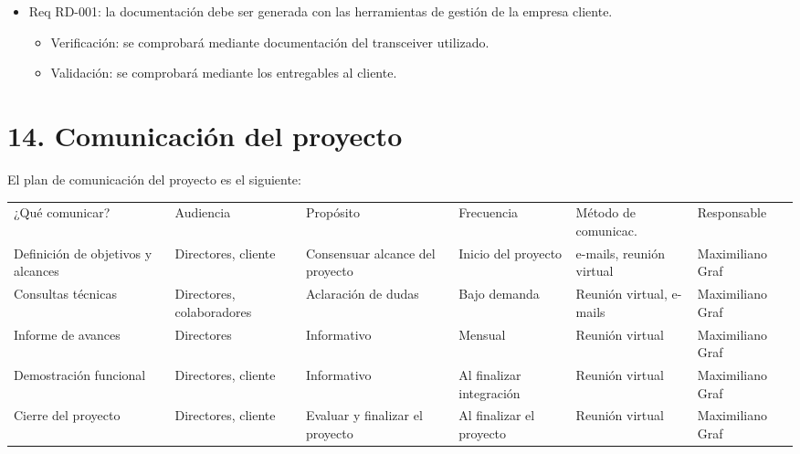 \documentclass[11pt]{charter}
\begin{document}
\begin{itemize} 
\item Req RD-001: la documentación debe ser generada con las herramientas de gestión de la empresa cliente.
\begin{itemize}
\item Verificación: se comprobará mediante documentación del transceiver utilizado. 
\item Validación: se comprobará mediante los entregables al cliente.
\end{itemize}
\end{itemize}



\section{14. Comunicación del proyecto}
\label{sec:comunicaciones}

El plan de comunicación del proyecto es el siguiente:

\begin{table}[htpb]
\centering
\begin{tabularx}{\linewidth}{@{}|C{2.3cm}|C{2.3cm}|C{2.5cm}|C{1.8cm}|C{2.3cm}|C{2.1cm}|@{}}
\hline
{} 
           \\ \hline
{} 
¿Qué comunicar? & Audiencia & Propósito & Frecuencia & Método de comunicac. & Responsable \\ \hline
Definición de objetivos y alcances                &  Directores, cliente         &    Consensuar alcance del proyecto       &     Inicio del proyecto   & e-mails, reunión virtual    & Maximiliano Graf			  \\ \hline
Consultas técnicas   &   Directores, colaboradores    &     Aclaración de dudas      &     Bajo demanda     &     Reunión virtual, e-mails                 & Maximiliano Graf            \\ \hline
Informe de avances          &    Directores       &   Informativo   &    Mensual     &         Reunión virtual             & Maximiliano Graf            \\ \hline
Demostración funcional   &    Directores, cliente       &   Informativo        &    Al finalizar integración        &     Reunión virtual         & Maximiliano Graf            \\ \hline
Cierre del proyecto         &    Directores, cliente       &    Evaluar y finalizar el proyecto     &    Al finalizar el proyecto    &   Reunión virtual                   & Maximiliano Graf            \\ \hline
\end{tabularx}
\end{table}
\end{document}
